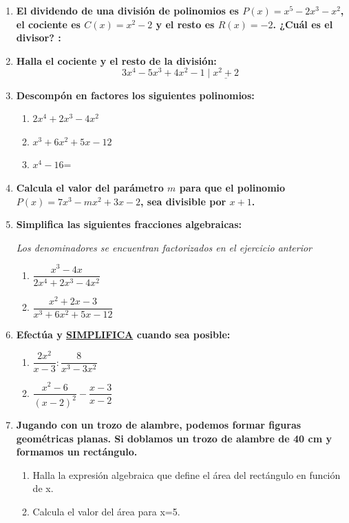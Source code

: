 \documentclass[a4paper,12pt]{extarticle}
\begin{document}
    \begin{enumerate}
        \item \textbf{El dividendo de una división de polinomios es $P(x) = x^5 - 2x^3 - x^2$, el cociente es $C(x) = x^2 - 2$ y el resto es $R(x) = -2$. ¿Cuál es el divisor? :}
            
        \item \textbf{Halla el cociente y el resto de la división:}
            \[
                3x^4 - 5x^3 + 4x^2 - 1 \;\Big|\!\underline{\;x^2 + 2\;}
            \]
        \item \textbf{Descompón en factores los siguientes polinomios:}
            \begin{enumerate}[label=\alph*), itemsep=0.5em]
                \item $2x^4 + 2x^3 - 4x^2$
                \item $x^3 + 6x^2 + 5x - 12$
                \item $x^4-16$=
            \end{enumerate}
        \item \textbf{Calcula el valor del parámetro {\color{numcolor}$m$} para que el polinomio $P(x) = 7x^3 - mx^2 + 3x - 2$, sea divisible por $x + 1$.}
        \item \textbf{Simplifica las siguientes fracciones algebraicas:}
        
            \textit{Los denominadores se encuentran factorizados en el ejercicio anterior}
            \begin{enumerate}[label=\alph*), itemsep=0.8em]
                \item $\dfrac{x^3 - 4x}{2x^4 + 2x^3 - 4x^2}$
                \item $\dfrac{x^2 + 2x - 3}{x^3 + 6x^2 + 5x - 12}$
            \end{enumerate}
        \item \textbf{Efectúa y \underline{SIMPLIFICA} cuando sea posible:}
            \begin{enumerate}[label=\alph*), itemsep=0.8em]
                \item $\dfrac{2x^2}{x - 3} : \dfrac{8}{x^3 - 3x^2}$
                \item $\dfrac{x^2 - 6}{(x - 2)^2} - \dfrac{x - 3}{x - 2}$
            \end{enumerate}
        \item \textbf{Jugando con un trozo de alambre, podemos formar figuras geométricas planas. Si doblamos un trozo de alambre de 40 cm y formamos un rectángulo. }
            \begin{enumerate}
                \item Halla la expresión algebraica que define el área del rectángulo en función de x.
                \item Calcula el valor del área para x=5.
            \end{enumerate} 
        

    \end{enumerate}
\end{document}
